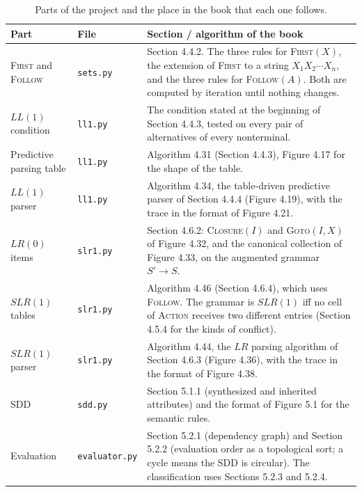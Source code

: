 \documentclass[11pt]{article}
\newcommand{\first}{\textsc{First}}
\newcommand{\follow}{\textsc{Follow}}
\newcommand{\closure}{\textsc{Closure}}
\newcommand{\gotofn}{\textsc{Goto}}
\begin{document}
\begin{table}[h]
\centering
\small
\begin{tabular}{@{}llp{7.4cm}@{}}
\toprule
\textbf{Part} & \textbf{File} & \textbf{Section / algorithm of the book} \\
\midrule
\first{} and \follow{}      & \texttt{sets.py}      & Section 4.4.2. The three rules for \first{}$(X)$, the extension of \first{} to a string $X_1X_2\cdots X_n$, and the three rules for \follow{}$(A)$. Both are computed by iteration until nothing changes. \\
\addlinespace
$LL(1)$ condition           & \texttt{ll1.py}       & The condition stated at the beginning of Section 4.4.3, tested on every pair of alternatives of every nonterminal. \\
\addlinespace
Predictive parsing table    & \texttt{ll1.py}       & Algorithm 4.31 (Section 4.4.3), Figure 4.17 for the shape of the table. \\
\addlinespace
$LL(1)$ parser              & \texttt{ll1.py}       & Algorithm 4.34, the table-driven predictive parser of Section 4.4.4 (Figure 4.19), with the trace in the format of Figure 4.21. \\
\addlinespace
$LR(0)$ items               & \texttt{slr1.py}      & Section 4.6.2: \closure{}$(I)$ and \gotofn{}$(I,X)$ of Figure 4.32, and the canonical collection of Figure 4.33, on the augmented grammar $S' \rightarrow S$. \\
\addlinespace
$SLR(1)$ tables             & \texttt{slr1.py}      & Algorithm 4.46 (Section 4.6.4), which uses \follow{}. The grammar is $SLR(1)$ iff no cell of \textsc{Action} receives two different entries (Section 4.5.4 for the kinds of conflict). \\
\addlinespace
$SLR(1)$ parser             & \texttt{slr1.py}      & Algorithm 4.44, the $LR$ parsing algorithm of Section 4.6.3 (Figure 4.36), with the trace in the format of Figure 4.38. \\
\addlinespace
SDD                         & \texttt{sdd.py}       & Section 5.1.1 (synthesized and inherited attributes) and the format of Figure 5.1 for the semantic rules. \\
\addlinespace
Evaluation                  & \texttt{evaluator.py} & Section 5.2.1 (dependency graph) and Section 5.2.2 (evaluation order as a topological sort; a cycle means the SDD is circular). The classification uses Sections 5.2.3 and 5.2.4. \\
\bottomrule
\end{tabular}
\caption{Parts of the project and the place in the book that each one follows.}
\label{tab:sections}
\end{table}
\end{document}
